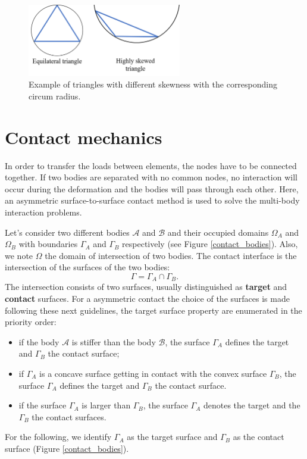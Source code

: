  \begin{figure}[!h]
\centering
\includegraphics[width=0.6\textwidth,keepaspectratio]{figures/skewness.png} 
\caption{Example of triangles with different skewness with the corresponding circum radius.}
\label{fig:skewness}
\end{figure}
 
\section{Contact mechanics}\label{section:contactmechanics}

In order to transfer the loads between elements, the nodes have to be connected together. If two bodies are separated with no common nodes, no interaction will occur during the deformation and the bodies will pass through each other. Here, an asymmetric surface-to-surface contact method is used to solve the multi-body interaction problems.

Let's consider two different bodies $\mathcal{A}$ and $\mathcal{B}$ and their occupied domains $\Omega_A$ and $\Omega_B$ with boundaries $\Gamma_A$ and $\Gamma_B$ respectively (see Figure \ref{contact_bodies}). Also, we note $\Omega$ the domain of intersection of two bodies. The contact interface is the intersection of the surfaces of the two bodies:
$$\Gamma = \Gamma_A \cap \Gamma_B.$$
The intersection consists of two surfaces, usually distinguished as \textbf{target} and \textbf{contact} surfaces. For a asymmetric contact the choice of the surfaces is made following these next guidelines, the target surface property are enumerated in the priority order:
\begin{itemize}
\item if the body $\mathcal{A}$ is stiffer than the body $\mathcal{B}$, the surface $\Gamma_A$ defines the target and $\Gamma_B$ the contact surface;
\item if $\Gamma_A$ is a concave surface getting in contact with the convex surface $\Gamma_B$, the surface $\Gamma_A$ defines the target and $\Gamma_B$ the contact surface.
\item if the surface $\Gamma_A$ is larger than $\Gamma_B$, the surface $\Gamma_A$ denotes the target and the $\Gamma_B$ the contact surfaces.
\end{itemize} 
For the following, we identify $\Gamma_A$ as the target surface and $\Gamma_B$ as the contact surface (Figure \ref{contact_bodies}). 

